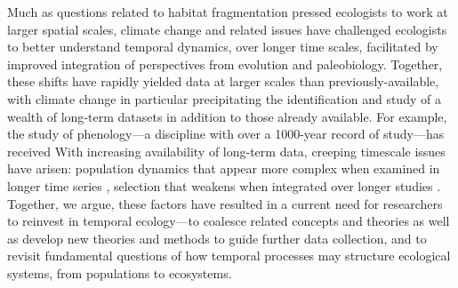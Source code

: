 \documentclass[11pt,a4paper,oneside]{article}
\begin{document}
Much as questions related to habitat fragmentation pressed ecologists to work at larger spatial scales, climate change and related issues have challenged ecologists to better understand temporal dynamics, over longer time scales, facilitated by improved integration of perspectives from evolution and paleobiology. Together, these shifts have rapidly yielded data at larger scales than previously-available, with climate change in particular precipitating the identification and study of a wealth of long-term datasets in addition to those already available. For example, the study of phenology---a discipline with over a 1000-year record of study---has received With increasing availability of long-term data, creeping timescale issues have arisen: population dynamics that appear more complex when examined in longer time series \citep{Ziebarth2010}, selection that weakens when integrated over longer studies \citep{Hendry1999,schoener2011}. Together, we argue, these factors have resulted in a current need for researchers to reinvest in temporal ecology---to coalesce related concepts and theories as well as develop new theories and methods to guide further data collection, and to revisit fundamental questions of how temporal processes may structure ecological systems, from populations to ecosystems.\\

\\
\end{document}
